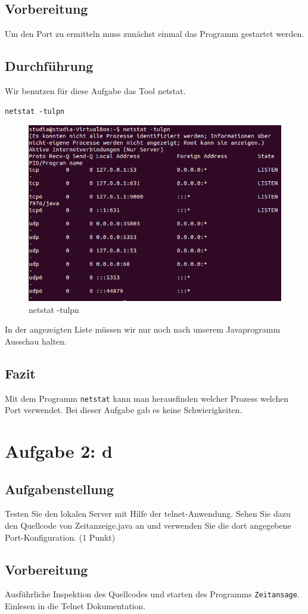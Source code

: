 \subsection{Vorbereitung}
Um den Port zu ermitteln muss zunächst einmal das Programm gestartet werden.

\subsection{Durchführung}
Wir benutzen für diese Aufgabe das Tool netstat.
\begin{lstlisting}
netstat -tulpn
\end{lstlisting}

\begin{figure}[H]
	\centering
	\includegraphics[width=0.4 \linewidth]{images/15}
	\caption{netstat -tulpn}
\end{figure}
In der angezeigten Liste müssen wir nur noch nach unserem Javaprogramm Ausschau halten.

\subsection{Fazit}
Mit dem Programm \texttt{netstat} kann man herausfinden welcher Prozess welchen Port verwendet. Bei dieser Aufgabe gab es keine Schwierigkeiten.

\section{Aufgabe 2: d}

\subsection{Aufgabenstellung}
Testen Sie den lokalen Server mit Hilfe der telnet-Anwendung. Sehen Sie dazu den Quellcode von Zeitanzeige.java an und verwenden Sie die dort angegebene Port-Konfiguration. (1 Punkt)

\subsection{Vorbereitung}
Ausführliche Inspektion des Quellcodes und starten des Programms \texttt{Zeitansage}.
Einlesen in die Telnet Dokumentation.

